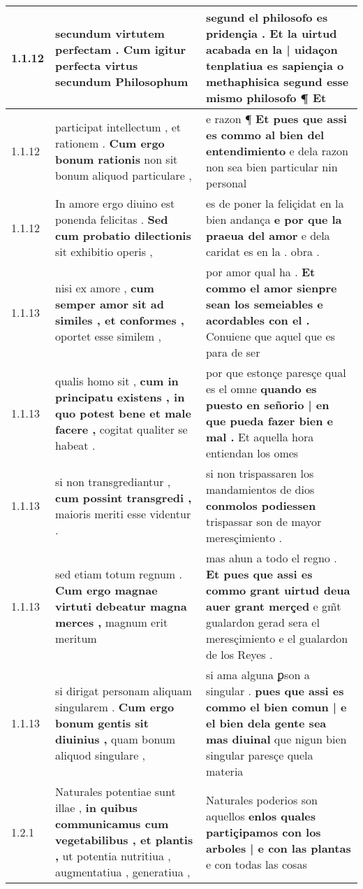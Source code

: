 \begin{tabular}{|p{1cm}|p{6.5cm}|p{6.5cm}|}
1.1.12 & secundum virtutem perfectam . \textbf{ Cum igitur perfecta virtus } secundum Philosophum & segund el philosofo es pridençia . \textbf{ Et la uirtud acabada en la | uidaçon tenplatiua es sapiençia o methaphisica } segund esse mismo philosofo ¶ Et \\\hline
1.1.12 & participat intellectum , et rationem . \textbf{ Cum ergo bonum rationis } non sit bonum aliquod particulare , & e razon ¶ \textbf{ Et pues que assi es commo al bien del entendimiento } e dela razon non sea bien particular nin personal \\\hline
1.1.12 & In amore ergo diuino est ponenda felicitas . \textbf{ Sed cum probatio dilectionis } sit exhibitio operis , & es de poner la feliçidat en la bien andança \textbf{ e por que la praeua del amor } e dela caridat es en la . obra . \\\hline
1.1.13 & nisi ex amore , \textbf{ cum semper amor sit ad similes , et conformes , } oportet esse similem , & por amor qual ha . \textbf{ Et commo el amor sienpre sean los semeiables e acordables con el . } Conuiene que aquel que es para de ser \\\hline
1.1.13 & qualis homo sit , \textbf{ cum in principatu existens , in quo potest bene et male facere , } cogitat qualiter se habeat . & por que estonçe paresçe qual es el omne \textbf{ quando es puesto en señorio | en que pueda fazer bien e mal . } Et aquella hora entiendan los omes \\\hline
1.1.13 & si non transgrediantur , \textbf{ cum possint transgredi , } maioris meriti esse videntur . & si non trispassaren los mandamientos de dios \textbf{ conmolos podiessen } trispassar son de mayor meresçimiento . \\\hline
1.1.13 & sed etiam totum regnum . \textbf{ Cum ergo magnae virtuti debeatur magna merces , } magnum erit meritum & mas ahun a todo el regno . \textbf{ Et pues que assi es commo grant uirtud deua auer grant merçed } e gm̃t gualardon gerad sera el meresçimiento e el gualardon de los Reyes . \\\hline
1.1.13 & si dirigat personam aliquam singularem . \textbf{ Cum ergo bonum gentis sit diuinius , } quam bonum aliquod singulare , & si ama alguna ꝑson a singular . \textbf{ pues que assi es commo el bien comun | e el bien dela gente sea mas diuinal } que nigun bien singular paresçe quela materia \\\hline
1.2.1 & Naturales potentiae sunt illae , \textbf{ in quibus communicamus cum vegetabilibus , et plantis , } ut potentia nutritiua , augmentatiua , generatiua , & Naturales poderios son aquellos \textbf{ enlos quales partiçipamos con los arboles | e con las plantas } e con todas las cosas \\\hline

\end{tabular}
